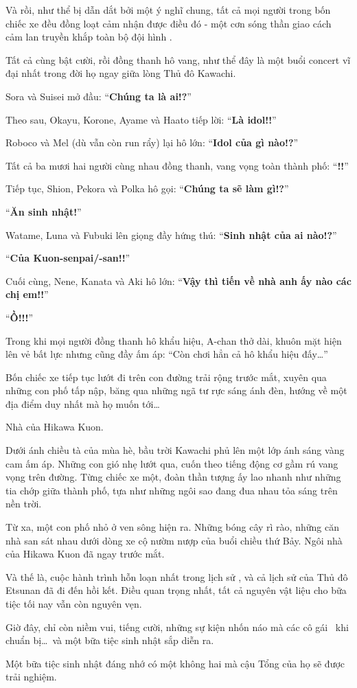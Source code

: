 \documentclass[../main.tex]{subfiles}
\begin{document}
Và rồi, như thể bị dẫn dắt bởi một ý nghĩ chung, tất cả mọi người trong bốn chiếc xe đều đồng loạt cảm nhận được điều đó -  một cơn sóng thần giao cách cảm lan truyền khắp toàn bộ đội hình \hll.

Tất cả cùng bật cười, rồi đồng thanh hô vang, như thể đây là một buổi concert vĩ đại nhất trong đời họ ngay giữa lòng Thủ đô Kawachi.

Sora và Suisei mở đầu: ``\textbf{Chúng ta là ai!?}''

Theo sau, Okayu, Korone, Ayame và Haato tiếp lời: ``\textbf{Là idol!!}''

Roboco và Mel (dù vẫn còn run rẩy) lại hô lớn: ``\textbf{Idol của gì nào!?}''

Tất cả ba mươi hai người cùng nhau đồng thanh, vang vọng toàn thành phố: ``\textbf{\hll!!}''

Tiếp tục, Shion, Pekora và Polka hô gọi: ``\textbf{Chúng ta sẽ làm gì!?}''

``\textbf{Ăn sinh nhật!}''

Watame, Luna và Fubuki lên giọng đầy hứng thú: ``\textbf{Sinh nhật của ai nào!?}''

``\textbf{Của Kuon-senpai/-san!!}''

Cuối cùng, Nene, Kanata và Aki hô lớn: ``\textbf{Vậy thì tiến về nhà anh ấy nào các chị em!!}''

``\textbf{Ồ!!!}''

Trong khi mọi người đồng thanh hô khẩu hiệu, A-chan thở dài, khuôn mặt hiện lên vẻ bất lực nhưng cũng đầy ấm áp: ``Còn chơi hẳn cả hô khẩu hiệu đấy\dots''

Bốn chiếc xe tiếp tục lướt đi trên con đường trải rộng trước mắt, xuyên qua những con phố tấp nập, băng qua những ngã tư rực sáng ánh đèn, hướng về một địa điểm duy nhất mà họ muốn tới\dots

Nhà của Hikawa Kuon.

Dưới ánh chiều tà của mùa hè, bầu trời Kawachi phủ lên một lớp ánh sáng vàng cam ấm áp. Những con gió nhẹ lướt qua, cuốn theo tiếng động cơ gầm rú vang vọng trên đường. Từng chiếc xe một, đoàn thần tượng ấy lao nhanh như những tia chớp giữa thành phố, tựa như những ngôi sao đang đua nhau tỏa sáng trên nền trời.

Từ xa, một con phố nhỏ ở ven sông hiện ra. Những bóng cây rì rào, những căn nhà san sát nhau dưới dòng xe cộ nườm nượp của buổi chiều thứ Bảy. Ngôi nhà của Hikawa Kuon đã ngay trước mắt.

Và thế là, cuộc hành trình hỗn loạn nhất trong lịch sử \hll, và cả lịch sử của Thủ đô Etsunan đã đi đến hồi kết. Điều quan trọng nhất, tất cả nguyên vật liệu cho bữa tiệc tối nay vẫn còn nguyên vẹn.

Giờ đây, chỉ còn niềm vui, tiếng cười, những sự kiện nhốn náo mà các cô gái \hll\ khi chuẩn bị\dots\ và một bữa tiệc sinh nhật sắp diễn ra.

Một bữa tiệc sinh nhật đáng nhớ có một không hai mà cậu Tổng của họ sẽ được trải nghiệm.
\end{document}
